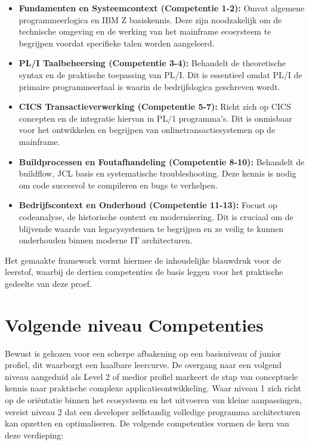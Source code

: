 \begin{itemize}
    \item \textbf{Fundamenten en Systeemcontext (Competentie 1-2):} Omvat algemene programmeerlogica en IBM Z basiskennis. Deze zijn noodzakelijk om de technische omgeving en de werking van het mainframe ecosysteem te begrijpen voordat specifieke talen worden aangeleerd.
    
    \item \textbf{PL/I Taalbeheersing (Competentie 3-4):} Behandelt de theoretische syntax en de praktische toepassing van PL/I. Dit is essentieel omdat PL/I de primaire programmeertaal is waarin de bedrijfslogica geschreven wordt.
    
    \item \textbf{CICS Transactieverwerking (Competentie 5-7):} Richt zich op CICS concepten en de integratie hiervan in PL/1 programma's. Dit is onmisbaar voor het ontwikkelen en begrijpen van onlinetransactiesystemen op de mainframe.
    
    \item \textbf{Buildprocessen en Foutafhandeling (Competentie 8-10):} Behandelt de buildflow, JCL basis en systematische troubleshooting. Deze kennis is nodig om code succesvol te compileren en bugs te verhelpen.
    
    \item \textbf{Bedrijfscontext en Onderhoud (Competentie 11-13):} Focust op codeanalyse, de historische context en modernisering. Dit is cruciaal om de blijvende waarde van legacysystemen te begrijpen en ze veilig te kunnen onderhouden binnen moderne IT architecturen.
\end{itemize}

Het gemaakte framework vormt hiermee de inhoudelijke blauwdruk voor de leerstof, waarbij de dertien competenties de basis leggen voor het praktische gedeelte van deze proef.
\section{Volgende niveau Competenties}%
\label{sec:Volgende-Competenties}

Bewust is gekozen voor een scherpe afbakening op een basisniveau of junior profiel, dit waarborgt een haalbare leercurve.
De overgang naar een volgend niveau aangeduid als Level 2 of medior profiel markeert de stap van conceptuele kennis naar praktische complexe applicatieontwikkeling.
Waar niveau 1 zich richt op de oriëntatie binnen het ecosysteem en het uitvoeren van kleine aanpassingen, vereist niveau 2 dat een developer zelfstandig volledige programma architecturen kan opzetten en optimaliseren.
De volgende competenties vormen de kern van deze verdieping:


